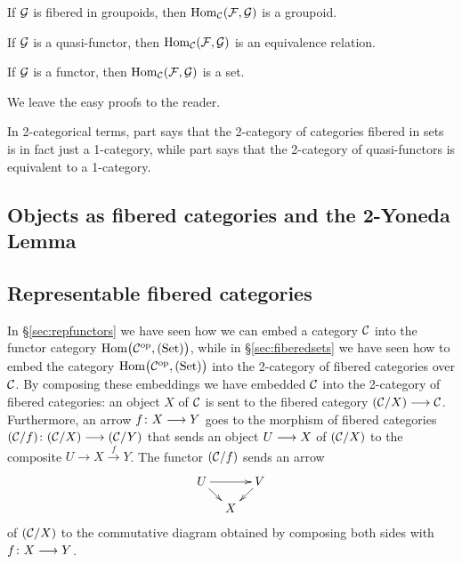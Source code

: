 \begin{3   FIBERED CATEGORIES}
\begin{3.5 Equivalences of fibered categories}
\begin{proposition}\hfil
\begin{enumeratei}

 If $\mathcal{G}$ is fibered in groupoids, then $\operatorname{Hom}_{\mathcal{C}}(\mathcal{F}, \mathcal{G})$ is a groupoid.

 If $\mathcal{G}$ is a quasi-functor, then $\operatorname{Hom}_{\mathcal{C}}(\mathcal{F}, \mathcal{G})$ is an equivalence relation.

 If $\mathcal{G}$ is a functor, then $\operatorname{Hom}_{\mathcal{C}}(\mathcal{F}, \mathcal{G})$ is a set.

\end{enumeratei}
\end{proposition}

We leave the easy proofs to the reader.

In 2-categorical terms, part  says that the 2-category of categories fibered in sets is in fact just a 1-category, while part  says that the 2-category of quasi-functors is equivalent to a 1-category.

\end{3.5 Equivalences of fibered categories}
\begin{3.6 Objects as fibcats and the 2-Yoneda}
\setcounter{section}{5}
\section{Objects as fibered categories and the 2-Yoneda Lemma}
\setcounter{theorem}{42}
\subsection{Representable fibered categories}

In \S\ref{sec:repfunctors} we have seen how we can embed a category $\mathcal{C}$ into the functor category $\mathrm{Hom}\bigl(\mathcal{C}^{\mathrm{op}}, (\mathrm{Set})\bigr)$, while in \S\ref{sec:fiberedsets} we have seen how to embed the category $\mathrm{Hom}\bigl(\mathcal{C}^{\mathrm{op}}, (\mathrm{Set})\bigr)$ into the 2-category of fibered categories over $\mathcal{C}$. By composing these embeddings we have embedded $\mathcal{C}$ into the 2-category of fibered categories: an object $X$ of $\mathcal{C}$ is sent to the fibered category $(\cC/X) \arr \cC$. Furthermore, an arrow $f \colon X \arr Y$ goes to the morphism of fibered categories $(\cC/f) \colon (\cC/X) \arr (\cC/Y)$ that sends an object $U \arr X$ of $(\mathcal{C}/X)$ to the composite $U \to X \overset f \to Y$. The functor $(\mathcal{C}/f)$ sends an arrow
   \[
   \xymatrix@-15pt{
   U\ar[rd]\ar[rr]&&V\ar[ld]\\
   &X&
   }
   \]
of $(\mathcal{C}/X)$ to the commutative diagram obtained by composing both sides with $f \colon X \arr Y$. 


\end{3.6 Objects as fibcats and the 2-Yoneda}
\end{3   FIBERED CATEGORIES}
